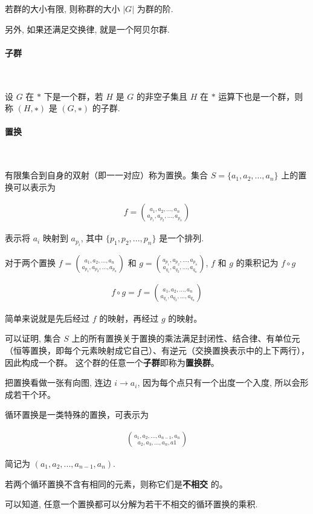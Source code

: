 \documentclass{ctexart}
\begin{document}
若群的大小有限, 则称群的大小 $|G|$ 为群的阶.

另外, 如果还满足交换律, 就是一个阿贝尔群.
\paragraph{子群}\

设 $G$ 在 $*$ 下是一个群，若 $H$ 是 $G$ 的非空子集且 $H$ 在 $*$ 运算下也是一个群，则称 $(H, ∗)$ 是 $(G, ∗)$ 的子群.

\paragraph{置换}\ 

有限集合到自身的双射（即一一对应）称为置换。集合 $S=\{a_1,a_2,...,a_n\}$ 上的置换可以表示为

\begin{align*}
    f = \binom{a_1,a_2,...,a_n}{a_{p_1},a_{p_2},...,a_{p_n}}
\end{align*}

表示将 $a_i$ 映射到 $a_{p_i}$, 其中 $\{p_1,p_2,...,p_n\}$ 是一个排列.

对于两个置换 $f = \binom{a_1,a_2,...,a_n}{a_{p_1},a_{p_2},...,a_{p_n}}$ 
和 $g = \binom{a_{p_1},a_{p_2},...,a_{p_n}}{a_{q_1},a_{q_2},...,a_{q_n}}$,
$f$ 和 $g$ 的乘积记为 $f \circ g$

\begin{align*}
    f \circ g = f = \binom{a_1,a_2,...,a_n}{a_{q_1},a_{q_2},...,a_{q_n}}
\end{align*}
 
简单来说就是先后经过 $f$ 的映射，再经过 $g$ 的映射。

可以证明, 集合 $S$ 上的所有置换关于置换的乘法满足封闭性、结合律、有单位元（恒等置换，即每个元素映射成它自己）、有逆元（交换置换表示中的上下两行），因此构成一个群。
这个群的任意一个\textbf{子群}即称为\textbf{置换群}。

把置换看做一张有向图, 连边 $i\rightarrow a_i$, 因为每个点只有一个出度一个入度, 所以会形成若干个环。 

循环置换是一类特殊的置换，可表示为

\begin{align*}
    \binom{a_1,a_2,...,a_{n-1},a_n}{a_{2},a_{3},...,a_{n},a{1}}
\end{align*}

简记为 $(a_1,a_2,...,a_{n-1},a_n)$.

若两个循环置换不含有相同的元素，则称它们是\textbf{不相交} 的。

可以知道, 任意一个置换都可以分解为若干不相交的循环置换的乘积.
\end{document}
